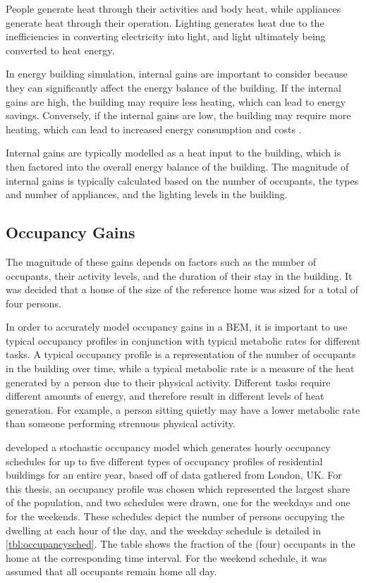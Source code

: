People generate heat through their activities and body heat, while appliances generate heat through their operation. Lighting generates heat due to the inefficiencies in converting electricity into light, and light ultimately being converted to heat energy.

In energy building simulation, internal gains are important to consider because they can significantly affect the energy balance of the building. If the internal gains are high, the building may require less heating, which can lead to energy savings. Conversely, if the internal gains are low, the building may require more heating, which can lead to increased energy consumption and costs \cite{buttitta_high-temporal_2020}. 

Internal gains are typically modelled as a heat input to the building, which is then factored into the overall energy balance of the building. The magnitude of internal gains is typically calculated based on the number of occupants, the types and number of appliances, and the lighting levels in the building.

\subsection{Occupancy Gains}
The magnitude of these gains depends on factors such as the number of occupants, their activity levels, and the duration of their stay in the building. It was decided that a house of the size of the reference home was sized for a total of four persons. 

In order to accurately model occupancy gains in a \ac{BEM}, it is important to use typical occupancy profiles in conjunction with typical metabolic rates for different tasks. A typical occupancy profile is a representation of the number of occupants in the building over time, while a typical metabolic rate is a measure of the heat generated by a person due to their physical activity. Different tasks require different amounts of energy, and therefore result in different levels of heat generation. For example, a person sitting quietly may have a lower metabolic rate than someone performing strenuous physical activity.

\citeauthor{buttitta_high-temporal_2020} \cite{buttitta_high-temporal_2020} developed a stochastic occupancy model which generates hourly occupancy schedules for up to five different types of occupancy profiles of residential buildings for an entire year, based off of data gathered from London, UK. For this thesis, an occupancy profile was chosen which represented the largest share of the population, and two schedules were drawn, one for the weekdays and one for the weekends. These schedules depict the number of persons occupying the dwelling at each hour of the day, and the weekday schedule is detailed in \cref{tbl:occupancysched}. The table shows the fraction of the (four) occupants in the home at the corresponding time interval. For the weekend schedule, it was assumed that all occupants remain home all day.

